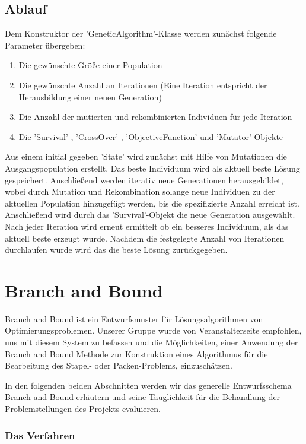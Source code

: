 \documentclass[runningheads,a4paper]{llncs}
\begin{document}
\subsection{Ablauf}

Dem Konstruktor der 'GeneticAlgorithm'-Klasse werden zunächst folgende Parameter übergeben:
\begin{enumerate}
\item Die gewünschte Größe einer Population 
\item Die gewünschte Anzahl an Iterationen (Eine Iteration entspricht der Herausbildung einer neuen Generation)
\item Die Anzahl der mutierten und rekombinierten Individuen für jede Iteration
\item Die 'Survival'-, 'CrossOver'-, 'ObjectiveFunction' und 'Mutator'-Objekte
\end{enumerate}
Aus einem initial gegeben 'State' wird zunächst mit Hilfe von Mutationen die Ausgangspopulation erstellt. Das beste Individuum wird als aktuell beste Lösung gespeichert. Anschließend werden iterativ neue Generationen herausgebildet, wobei durch Mutation und Rekombination solange neue Individuen zu der aktuellen Population hinzugefügt werden, bis die spezifizierte Anzahl erreicht ist. Anschließend wird durch das 'Survival'-Objekt die neue Generation ausgewählt. Nach jeder Iteration wird erneut ermittelt ob ein besseres Individuum, als das aktuell beste erzeugt wurde. Nachdem die festgelegte Anzahl von Iterationen durchlaufen wurde wird das die beste Lösung zurückgegeben. 

\section{Branch and Bound}

Branch and Bound ist ein Entwurfsmuster für Lösungsalgorithmen von Optimierungsproblemen. Unserer Gruppe wurde von Veranstalterseite empfohlen, uns mit diesem System zu befassen und  die Möglichkeiten, einer Anwendung der Branch and Bound Methode zur Konstruktion eines Algorithmus für die Bearbeitung des Stapel- oder Packen-Problems, einzuschätzen.

In den folgenden beiden Abschnitten werden wir das generelle Entwurfsschema Branch and Bound erläutern und seine Tauglichkeit für die Behandlung der Problemstellungen des Projekts evaluieren.

\subsubsection{Das Verfahren}
\end{document}
